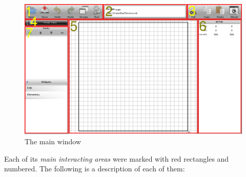 \documentclass[a4paper]{profusion}
\begin{document}
\begin{figure}[h!]
  \centering
  \includegraphics[width=1.0\textwidth]{images/main_window.png}
  \caption{The main window}
  \label{fig:main_window}
\end{figure}

Each of its \emph{main interacting areas} were marked with red
rectangles and numbered. The following is a description of each of
them:
\end{document}
